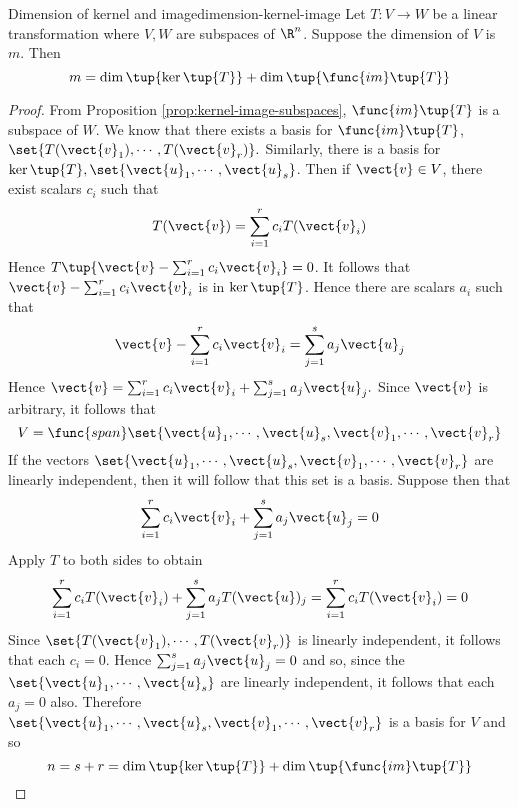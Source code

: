 \begin{theorem}{Dimension of kernel and image}{dimension-kernel-image}
Let $T:V\rightarrow W$ be a linear transformation where $V,W$ are subspaces of $\R^n$. Suppose the dimension of $V$ is $m$. Then 
\[
m=\dim \tup{\ker \tup{T} } +\dim \tup{\func{im}\tup{
T} } 
\]
\end{theorem}

\begin{proof}
From Proposition \ref{prop:kernel-image-subspaces}, $\func{im}\tup{T} $ is a subspace of $W$. We know that there exists a basis for $\func{im}\tup{T}$, $\set{T(\vect{v}
_{1}),\cdots ,T(\vect{v}_{r})} . $ Similarly, there is a basis for $\ker
\tup{T} ,\set{\vect{u}_{1},\cdots ,\vect{u}_{s}}$. Then if $
\vect{v}\in V$, there exist scalars $c_{i}$ such that 
\begin{equation*}
T(\vect{v})=\sum_{i=1}^{r}c_{i}T(\vect{v}_{i})
\end{equation*}
Hence $T\tup{\vect{v}-\sum_{i=1}^{r}c_{i}\vect{v}_{i}} =0$. It follows
that $\vect{v}-\sum_{i=1}^{r}c_{i}\vect{v}_{i}$ is in $\ker \tup{T} $.
Hence there are scalars $a_{i}$ such that 
\begin{equation*}
\vect{v}-\sum_{i=1}^{r}c_{i}\vect{v}_{i}=\sum_{j=1}^{s}a_{j}\vect{u}_{j}
\end{equation*}
Hence $\vect{v}=\sum_{i=1}^{r}c_{i}\vect{v}_{i}+\sum_{j=1}^{s}a_{j}\vect{u}
_{j}. $ Since $\vect{v}$ is arbitrary, it follows that 
\begin{equation*}
V=\func{span}\set{\vect{u}_{1},\cdots ,\vect{u}_{s},\vect{v}_{1},\cdots ,
\vect{v}_{r}}
\end{equation*}
If the vectors $\set{\vect{u}_{1},\cdots ,\vect{u}_{s},\vect{v}_{1},\cdots ,
\vect{v}_{r}} $ are linearly independent, then it will follow that
this set is a basis. Suppose then that 
\begin{equation*}
\sum_{i=1}^{r}c_{i}\vect{v}_{i}+\sum_{j=1}^{s}a_{j}\vect{u}_{j}=0
\end{equation*}
Apply $T$ to both sides to obtain 
\begin{equation*}
\sum_{i=1}^{r}c_{i}T(\vect{v}_{i})+\sum_{j=1}^{s}a_{j}T(\vect{u})
_{j}=\sum_{i=1}^{r}c_{i}T(\vect{v}_{i})=0
\end{equation*}
Since $\set{T(\vect{v}_{1}),\cdots ,T(\vect{v}_{r})} $ is linearly
independent, it follows that each $c_{i}=0$. Hence $\sum_{j=1}^{s}a_{j}\vect{u
}_{j}=0$ and so, since the $\set{\vect{u}_{1},\cdots ,\vect{u}_{s}} $
are linearly independent, it follows that each $a_{j}=0$ also. Therefore $\set{\vect{u}_{1},\cdots ,\vect{u}_{s},\vect{v}_{1},\cdots ,\vect{v}
_{r}} $ is a basis for $V$ and so 
\begin{equation*}
n=s+r=\dim \tup{\ker \tup{T} } +\dim \tup{\func{im}\tup{
T} } 
\end{equation*}
\end{proof}

